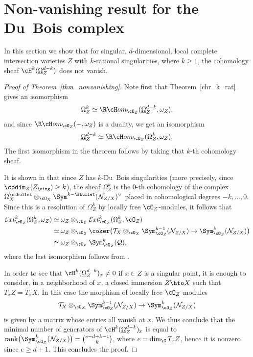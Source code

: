 \section{Non-vanishing result for the Du~Bois complex}\label{section_nonvanishing}

In this section we show that for singular, $d$-dimensional, local complete intersection varieties $Z$ with $k$-rational singularities, where $k\geq 1$,
the cohomology sheaf $\cH^k(\underline{\Omega}_Z^{d-k})$ does not vanish.

\begin{proof}[Proof of Theorem~\ref{thm_nonvanishing}]
Note first that Theorem~\ref{chr_k_rat} gives an isomorphism
\[\Omega_Z^k\simeq \R\cH om_{\cO_Z}(\underline{\Omega}_Z^{d-k},\omega_Z),\]
and since $\R\cH om_{\cO_Z}(-,\omega_Z)$ is a duality, we get an isomorphism
\[\underline{\Omega}_Z^{d-k}\simeq \R\cH om_{\cO_Z}(\Omega_Z^k,\omega_Z).\]
The first isomorphism in the theorem follows by taking that $k$-th cohomology sheaf.

It is shown in \cite[\S 5.2]{MP1} that since
$Z$ has $k$-Du~Bois singularities (more precisely, since $\codim_Z(Z_\sing)\geq k$), the sheaf $\Omega_Z^k$ is the $0$-th
cohomology of the complex \hbox{$\Omega_X^{\csbullet} \otimes_{\cO_X} \Sym^{k-\sbullet}({\mathcal N}_{Z/X})^{\vee}$} placed in cohomological degrees $-k,\ldots,0$. Since this is a resolution of $\Omega_Z^k$ by locally free $\cO_Z$-modules, it follows that
\begin{align*}
{\mathcal Ext}^k_{\cO_Z}(\Omega_Z^k,\omega_Z)&\simeq \omega_Z\otimes_{\cO_Z}{\mathcal Ext}^k_{\cO_Z}(\Omega_Z^k,\cO_Z)\\
&\simeq\omega_Z\otimes_{\cO_Z} \coker\big({\mathcal T}_X\otimes_{\cO_X}\Sym_{\cO_Z}^{k-1}({\mathcal N}_{Z/X})\to
\Sym_{\cO_Z}^{k}({\mathcal N}_{Z/X})\big)\\
&\simeq \omega_Z\otimes_{\cO_Z}\Sym^k_{\cO_Z}({\mathcal Q}),
\end{align*}
where the last isomorphism follows from \cite[Prop.\,A2.2(d)]{DE}.

In order to see that $\cH^k(\underline{\Omega}_Z^{d-k})_x\neq 0$ if $x\in Z$ is a singular point, it is enough to consider, in a neighborhood of $x$,
a closed immersion $Z\hto X$ such that $T_xZ=T_xX$. In this case the morphism of locally free $\cO_Z$-modules
\[{\mathcal T}_X\otimes_{\cO_X}\Sym_{\cO_Z}^{k-1}({\mathcal N}_{Z/X})\to
\Sym_{\cO_Z}^{k}({\mathcal N}_{Z/X})\]
is given by a matrix whose entries all vanish at $x$. We thus conclude that the minimal number of generators of
$\cH^k(\underline{\Omega}_Z^{d-k})_x$ is equal to $\mathrm{rank}\big(\Sym_{\cO_Z}^k({\mathcal N}_{Z/X})\big)=\binom{e-d+k-1}{k}$,
where $e=\dim_{\C}T_xZ$, hence it is nonzero since $e\geq d+1$. This concludes the proof.
\end{proof}

